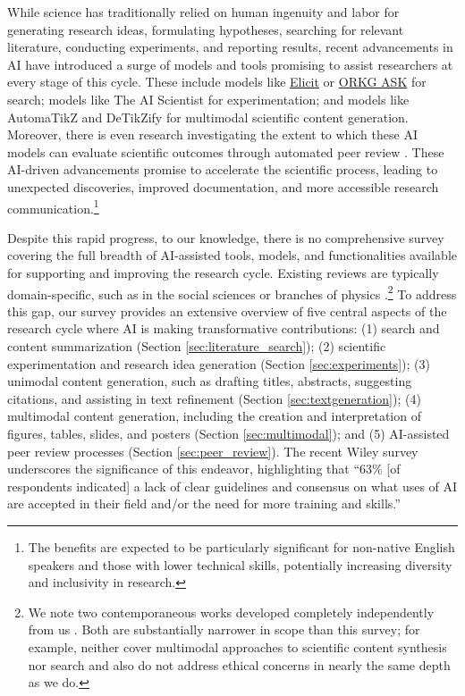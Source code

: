 While science has traditionally relied on human ingenuity and labor for generating research ideas, formulating hypotheses, searching for relevant literature, conducting experiments, and reporting results, recent advancements in AI have introduced a surge of models and tools promising to assist researchers at every stage of this cycle. These include models like \href{https://elicit.com}{Elicit} or \href{https://ask.orkg.org/de}{ORKG ASK} for search; models like The AI Scientist \citep{lu2024aiscientist} for experimentation; and models like AutomaTikZ \citep{belouadi2024automatikz} and DeTikZify \citep{belouadi2024detikzify} for multimodal scientific content generation. Moreover, there is even research investigating the extent to which these AI models can evaluate scientific outcomes through automated peer review \cite{10.1613/jair.1.12862}. These AI-driven advancements promise to accelerate the scientific process, leading to unexpected discoveries, improved documentation, and more accessible research communication.\footnote{The benefits are expected to be particularly significant for non-native English speakers and those with lower technical skills, potentially increasing diversity and inclusivity in research.}

Despite this rapid progress, to our knowledge, there is no comprehensive survey covering the full breadth of AI-assisted tools, models, and functionalities available for supporting and improving the research cycle. Existing reviews are typically domain-specific, such as in the social sciences \cite{XU2024103665} or branches of physics \cite{Zhang2023ArtificialIF}.\footnote{We note two contemporaneous works developed completely independently from us \cite{zhang-etal-2024-comprehensive-survey,luo2025llm4srsurveylargelanguage}. Both are substantially narrower in scope than this survey; for example, \citet{luo2025llm4srsurveylargelanguage} neither cover multimodal approaches to scientific content synthesis nor search and also do not address ethical concerns in nearly the same depth as we do.} To address this gap, our survey provides an extensive overview of five central aspects of the research cycle where AI is making transformative contributions: (1) search and content summarization (Section \ref{sec:literature_search}); (2) scientific experimentation and research idea generation (Section \ref{sec:experiments}); (3) unimodal content generation, such as drafting titles, abstracts, suggesting citations, and assisting in text refinement (Section \ref{sec:textgeneration}); (4) multimodal content generation, including the creation and interpretation of figures, tables, slides, and posters (Section \ref{sec:multimodal}); and (5) AI-assisted peer review processes (Section \ref{sec:peer_review}). The recent Wiley survey underscores the significance of this endeavor, highlighting that ``63\% [of respondents indicated] a lack of clear guidelines and consensus on what uses of AI are accepted in their field and/or the need for more training and skills.''

